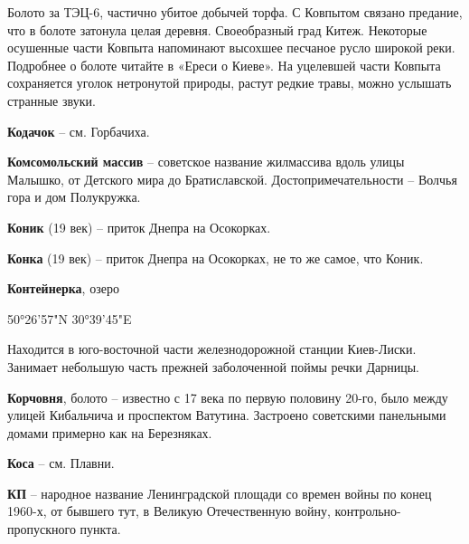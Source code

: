 Болото за ТЭЦ-6, частично убитое добычей торфа. С Ковпытом связано предание, что в болоте затонула целая деревня. Своеобразный град Китеж. Некоторые осушенные части Ковпыта напоминают высохшее песчаное русло широкой реки. Подробнее о болоте читайте в «Ереси о Киеве». На уцелевшей части Ковпыта сохраняется уголок нетронутой природы, растут редкие травы, можно услышать странные звуки.\\

\medskip


\textbf{Кодачок} – см. Горбачиха.\\

\medskip


\textbf{Комсомольский массив} – советское название жилмассива вдоль улицы Малышко, от Детского мира до Братиславской. Достопримечательности – Волчья гора и дом Полукружка.\\

\medskip


\textbf{Коник} (19 век) – приток Днепра на Осокорках.\\

\medskip


\textbf{Конка} (19 век) – приток Днепра на 
Осокорках, не то же самое, что Коник.\\

\medskip


\textbf{Контейнерка}, озеро

50°26'57"N 30°39'45"E

Находится в юго-восточной части железнодорожной станции Киев-Лиски. Занимает небо\-льшую часть прежней заболоченной поймы речки Дарницы.\\

\medskip


\textbf{Корчовня}, болото – известно с 17 века по первую половину 20-го, было между улицей Кибальчича и проспектом Ватутина. Застроено советскими панельными домами примерно как на Березняках.\\

\medskip

\textbf{Коса} – см. Плавни.\\

\medskip

\textbf{КП} – народное название Ленинградской площади со времен войны по конец 1960-х, от бывшего тут, в Великую Отечественную войну, кон\-трольно-пропускного пункта.\\ 

\medskip



